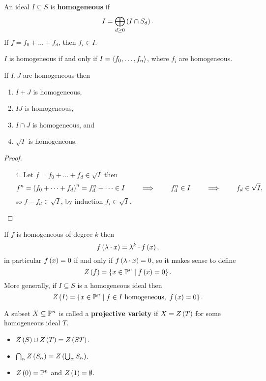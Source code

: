 \begin{definition}
An ideal $ I \subseteq S $ is \textbf{homogeneous} if
$$ I = \bigoplus_{d \ge 0} \rb{I \cap S_d}. $$
If $ f = f_0 + \dots + f_d $, then $ f_i \in I $.
\end{definition}

\begin{remark}
$ I $ is homogeneous if and only if $ I = \ab{f_0, \dots, f_n} $, where $ f_i $ are homogeneous.
\end{remark}

\begin{lemma}
If $ I, J $ are homogeneous then
\begin{enumerate}
\item $ I + J $ is homogeneous,
\item $ IJ $ is homogeneous,
\item $ I \cap J $ is homogeneous, and
\item $ \sqrt{I} $ is homogeneous.
\end{enumerate}
\end{lemma}

\begin{proof}
\hfill
\begin{itemize}
\item[4.] Let $ f = f_0 + \dots + f_d \in \sqrt{I} $ then
$$ f^n = \rb{f_0 + \dots + f_d}^n = f_d^n + \dots \in I \qquad \implies \qquad f_d^n \in I \qquad \implies \qquad f_d \in \sqrt{I}, $$
so $ f - f_d \in \sqrt{I} $, by induction $ f_i \in \sqrt{I} $.
\end{itemize}
\end{proof}

\begin{definition}
If $ f $ is homogeneous of degree $ k $ then
$$ f\rb{\lambda \cdot x} = \lambda^k \cdot f\rb{x}, $$
in particular $ f\rb{x} = 0 $ if and only if $ f\rb{\lambda \cdot x} = 0 $, so it makes sense to define
$$ Z\rb{f} = \cb{x \in \P^n \mid f\rb{x} = 0}. $$
More generally, if $ I \subseteq S $ is a homogeneous ideal then
$$ Z\rb{I} = \cb{x \in \P^n \mid f \in I \ \text{homogeneous}, \ f\rb{x} = 0}. $$
\end{definition}

\pagebreak

\begin{definition}
A subset $ X \subseteq \P^n $ is called a \textbf{projective variety} if $ X = Z\rb{T} $ for some homogeneous ideal $ T $.
\end{definition}

\begin{proposition}
\hfill
\begin{itemize}
\item $ Z\rb{S} \cup Z\rb{T} = Z\rb{ST} $.
\item $ \bigcap_\alpha Z\rb{S_\alpha} = Z\rb{\bigcup_\alpha S_\alpha} $.
\item $ Z\rb{0} = \P^n $ and $ Z\rb{1} = \emptyset $.
\end{itemize}
\end{proposition}

